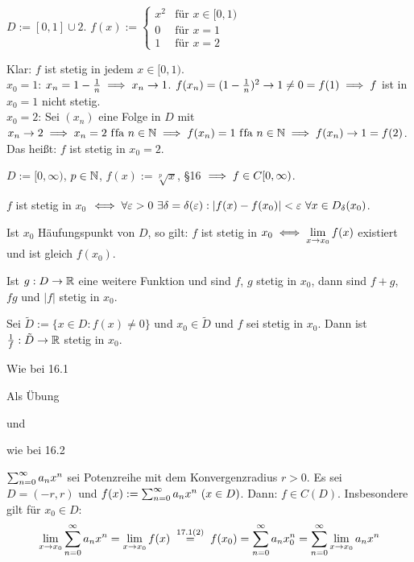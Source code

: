 \documentclass[a4paper,oneside,DIV15,BCOR12mm]{scrbook}
\begin{document}
\begin{beispiele}
\item $D:= [0,1]\cup{2}$. $f(x) := \begin{cases} x^2 & \text{für } x\in[0,1) \\ 0 & \text{für } x = 1 \\ 1 & \text{für } x=2 \end{cases}$

Klar: $f$ ist stetig in jedem $x\in[0,1)$.\\
$x_0 = 1$: $x_n = 1- \frac{1}{n} \implies x_n \to 1$. $f(x_n) = (1-\frac{1}{n})^2\to1 \ne0 = f(1) \implies f$ ist in $x_0 = 1$ nicht stetig. \\
$x_0 = 2$: Sei $(x_n)$ eine Folge in $D$ mit $x_n \to 2 \implies x_n = 2 \text{ f\/fa } n\in\mathbb{N} \implies f(x_n) = 1 \text{ f\/fa } n\in\mathbb{N} \implies f(x_n) \to 1 = f(2)$. Das heißt: $f$ ist stetig in $x_0 = 2$.
\item $D:= [0,\infty)$, $p\in\mathbb{N}$, $f(x) := \sqrt[p]{x}$, §16 $\implies f \in C[0,\infty)$.
\end{beispiele}

\begin{satz}[Stetigkeitssätze]
\begin{liste}
\item $f$ ist stetig in $x_0$ $\iff \forall \varepsilon > 0\  \exists \delta = \delta(\varepsilon): |f(x)-f(x_0)|<\varepsilon \ \forall x\in D_\delta(x_0)$.
\item Ist $x_0$ Häufungspunkt von $D$, so gilt: $f$ ist stetig in $x_0 \iff \displaystyle\lim_{x\to x_0}f(x)$ existiert und ist gleich $f(x_0)$.
\item Ist $g: D\to \mathbb{R}$ eine weitere Funktion und sind $f$, $g$ stetig in $x_0$, dann sind $f+g$, $fg$ und $|f|$ stetig in $x_0$.
\item Sei $\tilde D := \{x\in D: f(x)\ne0\}$ und $x_0 \in \tilde D$ und $f$ sei stetig in $x_0$. Dann ist $\frac{1}{f}: \tilde D\to\mathbb{R}$ stetig in $x_0$.
\end{liste}
\end{satz}

\begin{beweise}
\item Wie bei 16.1
\item Als Übung
\item und
\item wie bei 16.2
\end{beweise}

\begin{satz}
$\sum_{n=0}^{\infty}{a_n x^n}$ sei Potenzreihe mit dem Konvergenzradius $r>0$. Es sei $D=(-r,r)$ und $f(x) := \sum_{n=0}^{\infty}{a_nx^n}\ (x\in D)$. Dann: $f \in C(D)$. Insbesondere gilt für $x_0 \in D:$
$$\lim_{x\to x_0} \reihenull{a_nx^n} = \lim_{x\to x_0} f(x) \gleichnach{17.1(2)} f(x_0) = \reihenull{a_nx_0^n} = \reihenull{\lim_{x\to x_0}a_nx^n}$$
\end{satz}
\end{document}

